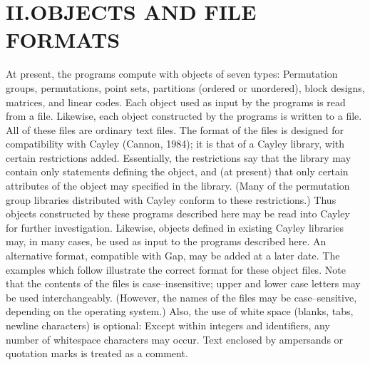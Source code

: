 \section{II.\quad OBJECTS AND FILE FORMATS}
%
At present, the programs compute with objects of seven types:  Permutation
groups, permutations, point sets, partitions (ordered or unordered),
block designs, matrices, and linear codes.  Each object used as
input by the programs is read from a file.  Likewise, each object constructed
by the programs is written to a file.  All of these files
are ordinary text files.  The format of the files is designed for
compatibility with Cayley (Cannon, 1984); it is that of a Cayley library,
with certain restrictions added.  Essentially, the restrictions say that
the library may contain only statements defining the object, and (at present)
that only certain attributes of the object may specified in the library.
(Many of the permutation group libraries distributed with Cayley conform
to these restrictions.)  Thus objects constructed by these programs 
described here may be read into Cayley for further investigation.
Likewise, objects defined in existing Cayley libraries may, in many cases,
be used as input to the programs described here.  An alternative format,
compatible with Gap, may be added at a later date.
\medbreak
The examples which follow illustrate the correct format for these object files.
Note that the contents of the files is case--insensitive; upper and lower case
letters may be used interchangeably.  (However, the names of the files may
be case--sensitive, depending on the operating system.)  Also, the
use of white space (blanks, tabs, newline characters) is optional:  Except
within integers and identifiers, any number of whitespace characters may
occur.  Text enclosed by ampersands or quotation marks is treated as a comment.
%

